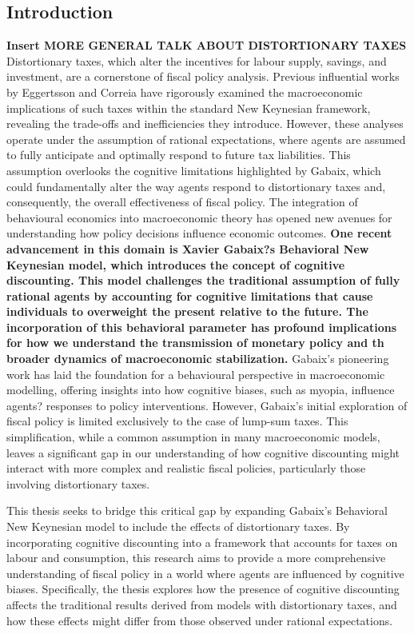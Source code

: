 \documentclass[11pt]{article}
\newcommand{\bb}{\bigbreak\noindent}
\begin{document}
\begin{spacing}{2}
\section{Introduction}
\textbf{Insert MORE GENERAL TALK ABOUT DISTORTIONARY TAXES}
\bb
Distortionary taxes, which alter the incentives for labour supply, savings, and investment, are a cornerstone of fiscal policy analysis. Previous influential works by Eggertsson and Correia have rigorously examined the macroeconomic implications of such taxes within the standard New Keynesian framework, revealing the trade-offs and inefficiencies they introduce. However, these analyses operate under the assumption of rational expectations, where agents are assumed to fully anticipate and optimally respond to future tax liabilities. This assumption overlooks the cognitive limitations highlighted by Gabaix, which could fundamentally alter the way agents respond to distortionary taxes and, consequently, the overall effectiveness of fiscal policy.
\bb
The integration of behavioural economics into macroeconomic theory has opened new avenues for understanding how policy decisions influence economic outcomes. \textbf{One recent advancement in this domain is Xavier Gabaix?s Behavioral New Keynesian model, which introduces the concept of cognitive discounting. This model challenges the traditional assumption of fully rational agents by accounting for cognitive limitations that cause individuals to overweight the present relative to the future. The incorporation of this behavioral parameter has profound implications for how we understand the transmission of monetary policy and th  broader dynamics of macroeconomic stabilization.}
\bb
Gabaix's pioneering work has laid the foundation for a behavioural perspective in macroeconomic modelling, offering insights into how cognitive biases, such as myopia, influence agents? responses to policy interventions. However, Gabaix's initial exploration of fiscal policy is limited exclusively to the case of lump-sum taxes. This simplification, while a common assumption in many macroeconomic models, leaves a significant gap in our understanding of how cognitive discounting might interact with more complex and realistic fiscal policies, particularly those involving distortionary taxes.

\bb
This thesis seeks to bridge this critical gap by expanding Gabaix's Behavioral New Keynesian model to include the effects of distortionary taxes. By incorporating cognitive discounting into a framework that accounts for taxes on labour and consumption, this research aims to provide a more comprehensive understanding of fiscal policy in a world where agents are influenced by cognitive biases. Specifically, the thesis explores how the presence of cognitive discounting affects the traditional results derived from models with distortionary taxes, and how these effects might differ from those observed under rational expectations.


\end{spacing}
\end{document}
